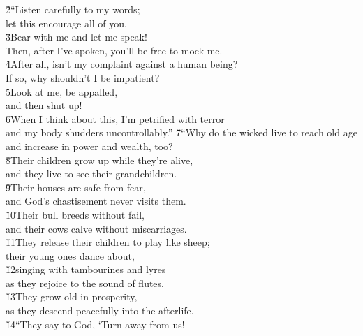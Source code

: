 \begin{poetry}
\poeml \v{2}``Listen carefully to my words; \\
\poemll    let this encourage all of you. \\
\poeml \v{3}Bear with me and let me speak! \\
\poemll    Then, after I've spoken, you'll be free to mock me. \\
\poeml \v{4}After all, isn't my complaint against a human being? \\
\poemll    If so, why shouldn't I be impatient? \\
\poeml \v{5}Look at me, be appalled, \\
\poemll    and then shut up! \\
\poeml \v{6}When I think about this, I'm petrified with terror \\
\poemll    and my body shudders uncontrollably.''
\poeml \v{7}``Why do the wicked live to reach old age \\
\poemll    and increase in power and wealth, too? \\
\poeml \v{8}Their children grow up while they're alive, \\
\poemll    and they live to see their grandchildren. \\
\poeml \v{9}Their houses are safe from fear, \\
\poemll    and God's chastisement never visits them. \\
\poeml \v{10}Their bull breeds without fail, \\
\poemll    and their cows calve without miscarriages. \\
\poeml \v{11}They release their children to play like sheep; \\
\poemll    their young ones dance about, \\
\poeml \v{12}singing with tambourines and lyres \\
\poemll    as they rejoice to the sound of flutes. \\
\poeml \v{13}They grow old in prosperity, \\
\poemll    as they descend peacefully into the afterlife. \\
\poeml \v{14}``They say to God, `Turn away from us! \\

\end{poetry}
